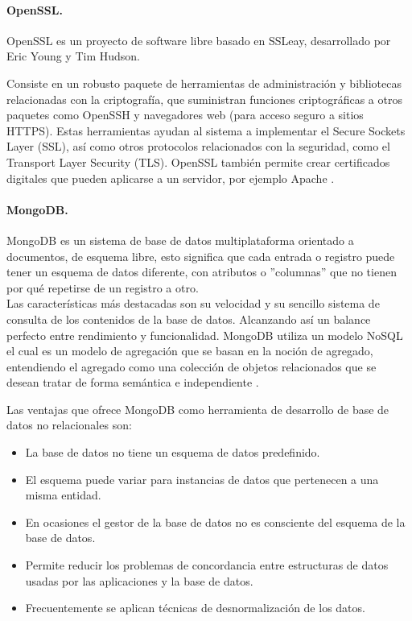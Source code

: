 \documentclass[12pt, a4paper, titlepage]{report}
\begin{document}
		    \paragraph{OpenSSL.\\}
		    OpenSSL es un proyecto de software libre basado en SSLeay, desarrollado por Eric Young y Tim Hudson.
            
            Consiste en un robusto paquete de herramientas de administración y bibliotecas relacionadas con la criptografía, que suministran funciones criptográficas a otros paquetes como OpenSSH y navegadores web (para acceso seguro a sitios HTTPS). Estas herramientas ayudan al sistema a implementar el Secure Sockets Layer (SSL), así como otros protocolos relacionados con la seguridad, como el Transport Layer Security (TLS). OpenSSL también permite crear certificados digitales que pueden aplicarse a un servidor, por ejemplo Apache \cite{opensslmillones}.
      
            \paragraph{MongoDB. \\}
            MongoDB es un sistema de base de datos multiplataforma orientado a documentos, de esquema libre, esto significa que cada entrada o registro puede tener un esquema de datos diferente, con atributos o ''columnas'' que no tienen por qué repetirse de un registro a otro. \\
            Las características más destacadas son su velocidad y su sencillo sistema de consulta de los contenidos de la base de datos. Alcanzando así un balance perfecto entre rendimiento y funcionalidad. 
            MongoDB utiliza un modelo NoSQL el cual es un modelo de agregación que se basan en la noción de agregado, entendiendo el agregado como una colección de objetos relacionados que se desean tratar de forma semántica e independiente \cite{refMongoDB}.
            
            Las ventajas que ofrece MongoDB como herramienta de desarrollo de base de datos no relacionales son:
            \begin{itemize}
                \item La base de datos no tiene un esquema de datos predefinido.
                \item El esquema puede variar para instancias de datos que pertenecen a una misma entidad.
                \item En ocasiones el gestor de la base de datos no es consciente del esquema de la base de datos.
                \item Permite reducir los problemas de concordancia entre estructuras de datos usadas por las aplicaciones y la base de datos.
                \item Frecuentemente se aplican técnicas de desnormalización de los datos.
            \end{itemize}
                    
\end{document}
